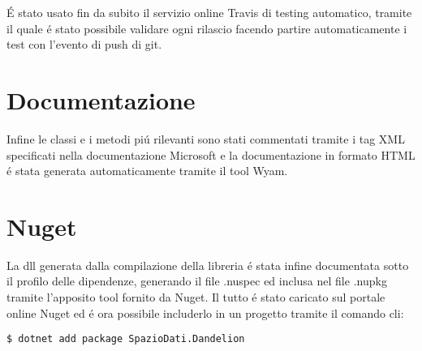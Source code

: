 \'E stato usato fin da subito il servizio online Travis di testing automatico, tramite il quale \'e stato possibile validare ogni rilascio facendo 
partire automaticamente i test con l'evento di push di git. 

\section{Documentazione}
Infine le classi e i metodi pi\'u rilevanti sono stati commentati tramite i tag XML specificati nella documentazione Microsoft e la documentazione in formato 
HTML \'e stata generata automaticamente tramite il tool Wyam.

\section{Nuget}
La dll generata dalla compilazione della libreria \'e stata infine documentata sotto il profilo delle dipendenze, generando il file .nuspec ed inclusa nel file .nupkg
tramite l'apposito tool fornito da Nuget. Il tutto \'e stato caricato sul portale online Nuget ed \'e ora possibile includerlo in un progetto tramite il comando cli:

\begin{lstlisting}[style=TexStyle]
$ dotnet add package SpazioDati.Dandelion
\end{lstlisting}